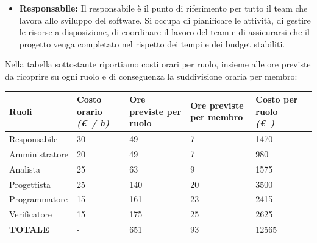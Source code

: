 \documentclass{article}
\begin{document}
\begin{itemize}
\begin{itemize}
        \item \textbf{Responsabile:} Il responsabile è il punto di riferimento per tutto il team che lavora allo sviluppo del software. Si occupa di pianificare le attività, di gestire le risorse a disposizione, di coordinare il lavoro del team e di assicurarsi che il progetto venga completato nel rispetto dei tempi e dei budget stabiliti.
    \end{itemize}
    \pagebreak
    Nella tabella sottostante riportiamo costi orari per ruolo, insieme alle ore previste da ricoprire su ogni ruolo e di conseguenza la suddivisione oraria per membro:
    \vspace{0.5cm}
    \begin{center}
        
    \begin{tabular}{|C{3cm}|C{2cm}|C{2cm}|C{2cm}|C{2cm}|C{2cm}|}
        \hline

        \textbf{Ruoli} & \textbf{Costo orario} \linebreak \textit{(\euro\ / h)} & \textbf{Ore previste per ruolo} & \textbf{Ore previste per membro} & \textbf{Costo per ruolo} \linebreak \textit{(\euro\ )} \\
        \hline\hline
        
        Responsabile & 30 & 49 & 7 & 1470 \\
        \hline
        
        Amministratore & 20 & 49 & 7 & 980 \\
        \hline
        
        Analista & 25 & 63 & 9 & 1575 \\
        \hline 
        
        Progettista & 25 & 140 & 20 & 3500 \\ 
        \hline
        
        Programmatore & 15 & 161 & 23 & 2415 \\
        \hline
        
        Verificatore & 15 & 175 & 25 & 2625 \\
        \hline\hline
        
        \textbf{TOTALE} & - & 651 & 93 & 12565 \\
        \hline
    \end{tabular}
    \end{center}

    
    \vspace{0.5cm}


\end{itemize}
\end{document}
